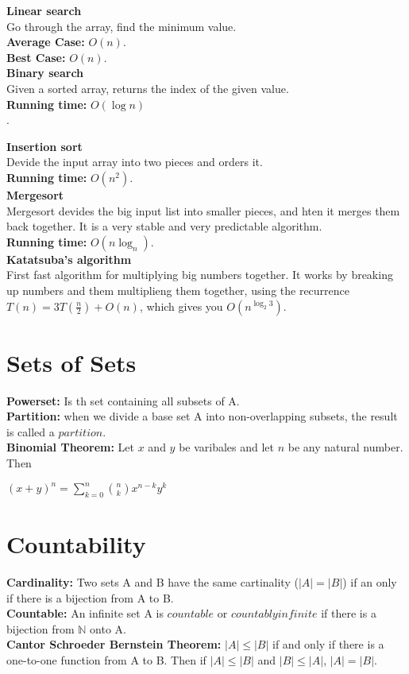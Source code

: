 \documentclass[a4paper]{article}
\begin{document}
{\large {\bf Linear search} }\\
Go through the array, find the minimum value.\\
{\bf Average Case:} $O(n)$.\\
{\bf Best Case:} $O(n)$.\\

{\large {\bf Binary search}}\\
Given a sorted array, returns the index of the given value.\\
{\bf Running time:} $O(\log n)$\\.

{\large {\bf Insertion sort}}\\
Devide the input array into two pieces and orders it.\\
{\bf Running time:} $O(n^2)$.\\

{\large {\bf Mergesort}}\\
Mergesort devides the big input list into smaller pieces, and hten it merges them back together. It is a very stable and very predictable algorithm.\\
{\bf Running time:} $O(n \log_n)$.\\

{\large {\bf Katatsuba's algorithm}}\\
First fast algorithm for multiplying big numbers together. It works by breaking up numbers and them multiplieng them together, using the recurrence $T(n)= 3T(\frac{n}{2})+O(n)$, which gives you $O(n^{\log_2 3})$.

\section{Sets of Sets}
{\bf Powerset:} Is th set containing all subsets of A.\\
{\bf Partition:} when we divide a base set A into non-overlapping subsets, the result is called a $partition$.\\
{\bf Binomial Theorem:} Let $x$ and $y$ be varibales and let $n$ be any natural number. Then\\
\begin{center}
$(x+y)^n=\sum^n_{k=0} {n \choose k}  x^{n-k} y^k$
\end{center}
\section{Countability}
{\bf Cardinality:} Two sets A and B have the same cartinality ($|A|=|B|$) if an only if there is a bijection from A to B.\\
{\bf Countable:} An infinite set A is $countable$ or $countably infinite$ if there is a bijection from $\mathbb{N}$ onto A.\\
{\bf Cantor Schroeder Bernstein Theorem:} $|A| \leq |B|$ if and only if there is a one-to-one function from A to B. Then if $|A| \leq |B|$ and $|B| \leq |A|$, $|A|=|B|$.
\end{document}
